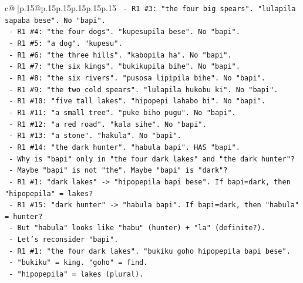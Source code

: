 \documentclass{article}
\begin{document}
{\begin{supertabular}{c@{$\;$}|p{.15\linewidth}@{}p{.15\linewidth}p{.15\linewidth}p{.15\linewidth}p{.15\linewidth}p{.15\linewidth}}
{{{\texttt{              {-} R1 \#3: "the four big spears". "lulapila sapaba bese". No "bapi".} \\
\texttt{              {-} R1 \#4: "the four dogs". "kupesupila bese". No "bapi".} \\
\texttt{              {-} R1 \#5: "a dog". "kupesu".} \\
\texttt{              {-} R1 \#6: "the three hills". "kabopila ha". No "bapi".} \\
\texttt{              {-} R1 \#7: "the six kings". "bukikupila bihe". No "bapi".} \\
\texttt{              {-} R1 \#8: "the six rivers". "pusosa lipipila bihe". No "bapi".} \\
\texttt{              {-} R1 \#9: "the two cold spears". "lulapila hukobu ki". No "bapi".} \\
\texttt{              {-} R1 \#10: "five tall lakes". "hipopepi lahabo bi". No "bapi".} \\
\texttt{              {-} R1 \#11: "a small tree". "puke biho pugu". No "bapi".} \\
\texttt{              {-} R1 \#12: "a red road". "kala sihe". No "bapi".} \\
\texttt{              {-} R1 \#13: "a stone". "hakula". No "bapi".} \\
\texttt{              {-} R1 \#14: "the dark hunter". "habula bapi". HAS "bapi".} \\
\texttt{              {-} Why is "bapi" only in "the four dark lakes" and "the dark hunter"?} \\
\texttt{              {-} Maybe "bapi" is not "the". Maybe "bapi" is "dark"?} \\
\texttt{              {-} R1 \#1: "dark lakes" {-}> "hipopepila bapi bese". If bapi=dark, then "hipopepila" = lakes?} \\
\texttt{              {-} R1 \#15: "dark hunter" {-}> "habula bapi". If bapi=dark, then "habula" = hunter?} \\
\texttt{              {-} But "habula" looks like "habu" (hunter) + "la" (definite?).} \\
\texttt{              {-} Let's reconsider "bapi".} \\
\texttt{              {-} R1 \#1: "the four dark lakes". "bukiku goho hipopepila bapi bese".} \\
\texttt{                {-} "bukiku" = king. "goho" = find.} \\
\texttt{                {-} "hipopepila" = lakes (plural).} \\
}}}
\end{supertabular}}
\end{document}
